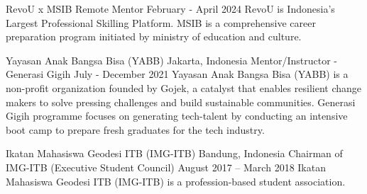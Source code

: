 \resumeSubheading
{RevoU x MSIB}
{Remote}
{Mentor}
{February - April 2024}
\small{RevoU is Indonesia’s Largest Professional Skilling Platform. MSIB is a comprehensive career preparation program initiated by ministry of education and culture.}
\vspace{-1pt}
\resumeItemListStart
{}
\resumeItemListEnd

\vspace{5pt}
\resumeSubheading
{Yayasan Anak Bangsa Bisa (YABB)}
{Jakarta, Indonesia}
{Mentor/Instructor - Generasi Gigih}
{July - December 2021}
\small{Yayasan Anak Bangsa Bisa (YABB) is a non-profit organization founded by Gojek, a
catalyst that enables resilient change makers to solve pressing challenges and build
sustainable communities. Generasi Gigih programme focuses on generating tech-talent
by conducting an intensive boot camp to prepare fresh graduates for the tech industry.}
\vspace{-1pt}
\resumeItemListStart
{}
\resumeItemListEnd

\vspace{5pt}
\resumeSubheading
{Ikatan Mahasiswa Geodesi ITB (IMG-ITB)}
{Bandung, Indonesia}
{Chairman of IMG-ITB (Executive Student Council)}
{August 2017 – March 2018}
\small{Ikatan Mahasiswa Geodesi ITB (IMG-ITB) is a profession-based student association.}
\vspace{-1pt}
\resumeItemListStart
{}
\resumeItemListEnd
